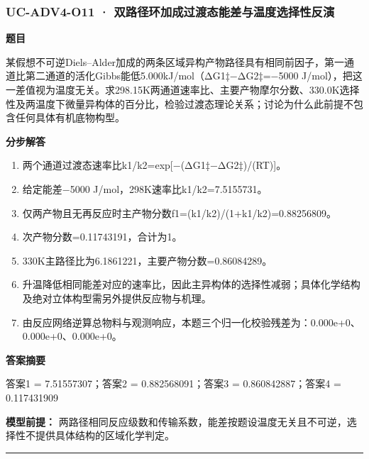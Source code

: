\documentclass[UTF8,11pt,a4paper]{ctexart}
\begin{document}
\subsubsection*{UC-ADV4-O11 · 双路径环加成过渡态能差与温度选择性反演}
\noindent\textbf{题目}\par
某假想不可逆Diels–Alder加成的两条区域异构产物路径具有相同前因子，第一通道比第二通道的活化Gibbs能低5.000kJ/mol（ΔG1‡−ΔG2‡=−5000 J/mol），把这一差值视为温度无关。求298.15K两通道速率比、主要产物摩尔分数、330.0K选择性及两温度下微量异构体的百分比，检验过渡态理论关系；讨论为什么此前提不包含任何具体有机底物构型。\par
\medskip\noindent\textbf{分步解答}
\begin{enumerate}
\item 两个通道过渡态速率比k1/k2=exp[−(ΔG1‡−ΔG2‡)/(RT)]。
\item 给定能差−5000 J/mol，298K速率比k1/k2=7.5155731。
\item 仅两产物且无再反应时主产物分数f1=(k1/k2)/(1+k1/k2)=0.88256809。
\item 次产物分数=0.11743191，合计为1。
\item 330K主路径比为6.1861221，主要产物分数=0.86084289。
\item 升温降低相同能差对应的速率比，因此主异构体的选择性减弱；具体化学结构及绝对立体构型需另外提供反应物与机理。
\item 由反应网络逆算总物料与观测响应，本题三个归一化校验残差为：0.000e+0、0.000e+0、0.000e+0。
\end{enumerate}
\noindent\textbf{答案摘要}\par
答案1 = 7.51557307；答案2 = 0.882568091；答案3 = 0.860842887；答案4 = 0.117431909\par
\noindent\textbf{模型前提：}
两路径相同反应级数和传输系数，能差按题设温度无关且不可逆，选择性不提供具体结构的区域化学判定。\par
\medskip\hrule\medskip
{}
\end{document}
